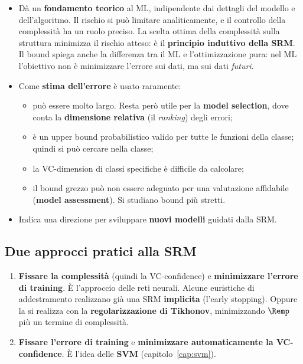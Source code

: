 \begin{itemize}
  \item Dà un \textbf{fondamento teorico} al ML, indipendente dai dettagli del modello e dell'algoritmo. Il
        rischio si può limitare analiticamente, e il controllo della complessità ha un ruolo preciso. La scelta
        ottima della complessità sulla struttura minimizza il rischio atteso: è il \textbf{principio induttivo
        della SRM}. Il bound spiega anche la differenza tra il ML e l'ottimizzazione pura: nel ML l'obiettivo non
        è minimizzare l'errore sui dati, ma sui dati \emph{futuri}.
  \item Come \textbf{stima dell'errore} è usato raramente:
        \begin{itemize}
          \item può essere molto largo. Resta però utile per la \textbf{model selection}, dove conta la
                \textbf{dimensione relativa} (il \emph{ranking}) degli errori;
          \item è un upper bound probabilistico valido per tutte le funzioni della classe; quindi si può cercare
                nella classe;
          \item la VC-dimension di classi specifiche è difficile da calcolare;
          \item il bound grezzo può non essere adeguato per una valutazione affidabile (\textbf{model
                assessment}). Si studiano bound più stretti.
        \end{itemize}
  \item Indica una direzione per sviluppare \textbf{nuovi modelli} guidati dalla SRM.
\end{itemize}

\subsection{Due approcci pratici alla SRM}

\begin{enumerate}
  \item \textbf{Fissare la complessità} (quindi la VC-confidence) e \textbf{minimizzare l'errore di training}.
        È l'approccio delle reti neurali. Alcune euristiche di addestramento realizzano già una SRM
        \textbf{implicita} (l'early stopping). Oppure la si realizza con la \textbf{regolarizzazione di
        Tikhonov}, minimizzando $\Remp$ più un termine di complessità.
  \item \textbf{Fissare l'errore di training} e \textbf{minimizzare automaticamente la VC-confidence}. È l'idea
        delle \textbf{SVM} (capitolo~\ref{cap:svm}).
\end{enumerate}

